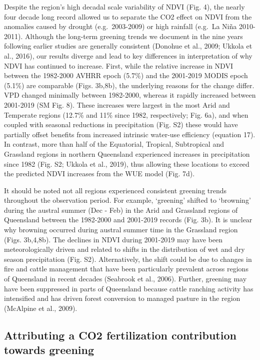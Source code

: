 \documentclass[gc, manuscript]{copernicus}
\begin{document}
Despite the region's high decadal scale variability of NDVI (Fig. 4),
the nearly four decade long record allowed us to separate the CO2 effect
on NDVI from the anomalies caused by drought (e.g.~2003-2009) or high
rainfall (e.g.~La Niña 2010-2011). Although the long-term greening
trends we document in the nine years following earlier studies are
generally consistent (Donohue et al., 2009; Ukkola et al., 2016), our
results diverge and lead to key differences in interpretation of why
NDVI has continued to increase. First, while the relative increase in
NDVI between the 1982-2000 AVHRR epoch (5.7\%) and the 2001-2019 MODIS
epoch (5.1\%) are comparable (Figs. 3b,8b), the underlying reasons for
the change differ. VPD changed minimally between 1982-2000, whereas it
rapidly increased between 2001-2019 (SM Fig. 8). These increases were
largest in the most Arid and Temperate regions (12.7\% and 11\% since
1982, respectively; Fig. 6a), and when coupled with seasonal reductions
in precipitation (Fig. S2) these would have partially offset benefits
from increased intrinsic water-use efficiency (equation 17). In
contrast, more than half of the Equatorial, Tropical, Subtropical and
Grassland regions in northern Queensland experienced increases in
precipitation since 1982 (Fig. S2; Ukkola et al., 2019), thus allowing
these locations to exceed the predicted NDVI increases from the WUE
model (Fig. 7d).

It should be noted not all regions experienced consistent greening
trends throughout the observation period. For example, `greening'
shifted to `browning' during the austral summer (Dec - Feb) in the Arid
and Grassland regions of Queensland between the 1982-2000 and 2001-2019
records (Fig. 3b). It is unclear why browning occurred during austral
summer time in the Grassland region (Figs. 3b,4,8b). The declines in
NDVI during 2001-2019 may have been meteorologically driven and related
to shifts in the distribution of wet and dry season precipitation (Fig.
S2). Alternatively, the shift could be due to changes in fire and cattle
management that have been particularly prevalent across regions of
Queensland in recent decades (Seabrook et al., 2006). Further, greening
may have been suppressed in parts of Queensland because cattle ranching
activity has intensified and has driven forest conversion to managed
pasture in the region (McAlpine et al., 2009).

\subsection{Attributing a CO2 fertilization contribution towards
greening}
\end{document}
